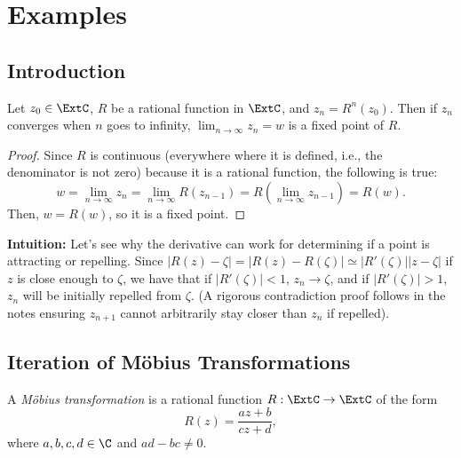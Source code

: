 \chapter{Examples}

\section{Introduction}

\begin{proposition} Let $z_0 \in \ExtC$, $R$ be a rational function in $\ExtC$, and $z_n
    = R^n(z_0)$. Then if $z_n$ converges when $n$ goes to infinity, $\lim_{n \to
    \infty} z_n = w$ is a fixed point of $R$.
\end{proposition}

\begin{proof}
    Since $R$ is continuous (everywhere where it is defined, i.e., the
    denominator is not zero) because it is a rational function, the following is
    true:
    \[
        w = \lim_{n \to \infty} z_n = \lim_{n \to \infty} R(z_{n-1}) = R\left(\lim_{n \to \infty} z_{n-1}\right) = R(w).
    \]
    Then, $w = R(w)$, so it is a fixed point.
\end{proof}

\textbf{Intuition:} Let's see why the derivative can work for determining if a
point is attracting or repelling. Since $|R(z) - \zeta| = |R(z) - R(\zeta)|
\simeq |R'(\zeta)| |z - \zeta|$ if $z$ is close enough to $\zeta$, we have that
if $|R'(\zeta)| < 1$, $z_n \to \zeta$, and if $|R'(\zeta)| > 1$, $z_n$ will be
initially repelled from $\zeta$. (A rigorous contradiction proof follows in the
notes ensuring $z_{n+1}$ cannot arbitrarily stay closer than $z_n$ if repelled).

\section{Iteration of Möbius Transformations}

\begin{definition}
    A \emph{Möbius transformation} is a rational function $R: \ExtC \to \ExtC$
    of the form
    \[ 
        R(z) = \frac{az+b}{cz+d},
    \]
    where $a, b, c, d \in \C$ and $ad - bc \neq 0$.
\end{definition}

